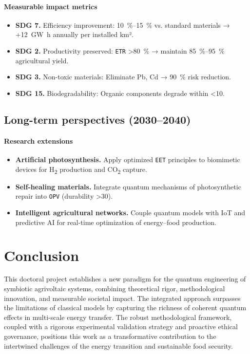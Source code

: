 \documentclass[12pt, a4paper]{article}
\begin{document}
\paragraph{Measurable impact metrics}
\begin{itemize}
    \item \textbf{SDG 7.} Efficiency improvement: \SIrange{+10}{+15}{\percent} vs. standard materials → +\SI{12}{\giga\watt\hour} annually per installed km².
    \item \textbf{SDG 2.} Productivity preserved: \texttt{ETR} \SI{>80}{\percent} → maintain \SIrange{85}{95}{\percent} agricultural yield.
    \item \textbf{SDG 3.} Non-toxic materials: Eliminate Pb, Cd → \SI{90}{\percent} risk reduction.
    \item \textbf{SDG 15.} Biodegradability: Organic components degrade within \SI{<10}{\year}.
\end{itemize}

\subsection{Long-term perspectives (2030–2040)}

\paragraph{Research extensions}
\begin{itemize}
    \item \textbf{Artificial photosynthesis.} Apply optimized \texttt{EET} principles to biomimetic devices for H\textsubscript{2} production and CO\textsubscript{2} capture.
    \item \textbf{Self-healing materials.} Integrate quantum mechanisms of photosynthetic repair into \texttt{OPV} (durability \SI{>30}{\year}).
    \item \textbf{Intelligent agricultural networks.} Couple quantum models with IoT and predictive AI for real-time optimization of energy–food production.
\end{itemize}

\section*{Conclusion}

This doctoral project establishes a new paradigm for the quantum engineering of symbiotic agrivoltaic systems, combining theoretical rigor, methodological innovation, and measurable societal impact. The integrated approach surpasses the limitations of classical models by capturing the richness of coherent quantum effects in multi-scale energy transfer. The robust methodological framework, coupled with a rigorous experimental validation strategy and proactive ethical governance, positions this work as a transformative contribution to the intertwined challenges of the energy transition and sustainable food security.
\end{document}
